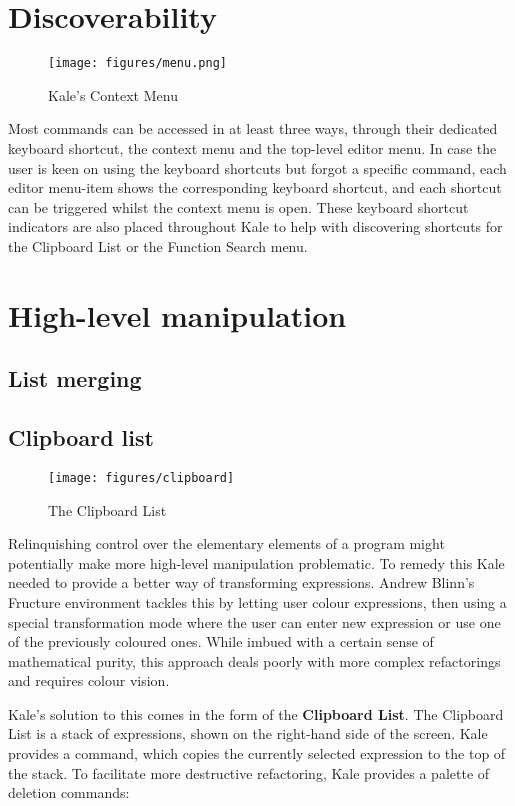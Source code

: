 \section{Discoverability}
\setlength\intextsep{0pt}
\begin{wrapfigure}[21]{R}{5.5cm}
\texttt{[image: figures/menu.png]}
\caption{Kale's Context Menu}
\end{wrapfigure}
Most commands can be accessed in at least three ways, through their dedicated
keyboard shortcut, the context menu and the top-level editor menu. In case the
user is keen on using the keyboard shortcuts but forgot a specific command,
each editor menu-item shows the corresponding keyboard shortcut, and each
shortcut can be triggered whilst the context menu is open. These keyboard
shortcut indicators are also placed throughout Kale to help with discovering
shortcuts for the Clipboard List or the Function Search menu.


\section{High-level manipulation}

\subsection{List merging}

\subsection{Clipboard list}
\begin{wrapfigure}[11]{R}{0.pt}
	\texttt{[image: figures/clipboard]}
	\caption{The Clipboard List}
\end{wrapfigure}

Relinquishing control over the elementary elements of a program might
potentially make more high-level manipulation problematic. To remedy this
Kale needed to provide a better way of transforming expressions. Andrew Blinn's
Fructure \cite{Fructure} environment tackles this by letting user colour
expressions, then
using a special transformation mode where the user can enter new expression or
use one of the previously coloured ones. While imbued with a certain sense of
mathematical purity, this approach deals poorly with more complex refactorings
and requires colour vision.

Kale's solution to this comes in the form of the \textbf{Clipboard List}. The
Clipboard List is a stack of expressions, shown on the right-hand side of the
screen. Kale provides a \hyperref[cmd:copy]{}  command, which
copies the currently
selected expression to the top of the stack. To facilitate more destructive
refactoring, Kale provides a palette of deletion commands:

